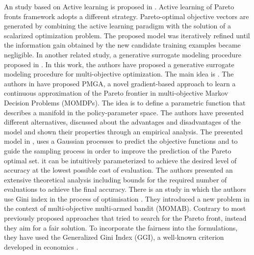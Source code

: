 \par
An study based on Active learning is proposed in \cite{campigotto2014active}. Active learning of Pareto fronts framework adopts a different strategy. Pareto-optimal objective vectors are generated by combining the active learning paradigm with the solution of a scalarized optimization problem. The proposed model was iteratively refined until the information gain obtained by the new candidate training examples became negligible.
In another related study, a generative surrogate modeling procedure proposed in \cite{hussein2016generative}. In this work, the authors have proposed a generative surrogate modeling procedure for multi-objective optimization. The main idea is . 
The authors in \cite{pirotta2015multi} have proposed PMGA, a novel gradient-based approach to learn a continuous approximation of the Pareto frontier in 
multi-objective Markov Decision Problems (MOMDPs). The idea is to define a parametric function that describes a manifold in the policy-parameter space.
The authors have presented different alternatives, discussed about the advantages and disadvantages of the model and shown their properties through an empirical analysis.
The presented model in \cite{zuluaga2013active}, uses a Gaussian processes to predict the objective functions and to guide the sampling process in
order to improve the prediction of the Pareto optimal set. it can be intuitively parameterized to achieve the desired level of accuracy at the lowest possible cost of evaluation. The authors presented an extensive theoretical analysis including bounds for the required number of evaluations to achieve the final accuracy. 
There is an study in which the authors use Gini index in the process of optimisation \cite{busa2017multi}. They introduced a new problem in the context of multi-objective multi-armed bandit (MOMAB). Contrary to most previously proposed approaches that tried to search for the Pareto front, instead they aim for a fair solution. To incorporate the fairness into the formulations, they have used the Generalized Gini Index (GGI), a well-known criterion developed in economics \cite{busa2017multi}.
